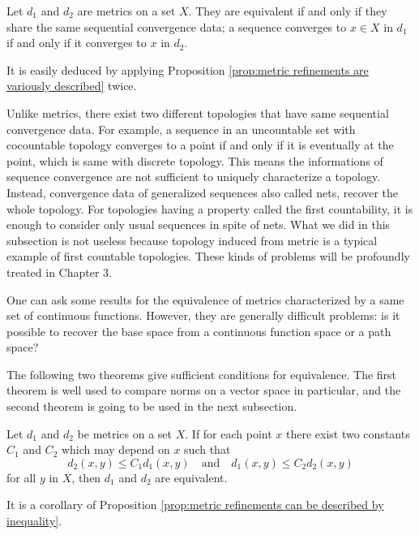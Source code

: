 \begin{prop}\label{prop:sequential convergence determines equivalent metrics}
Let $d_1$ and $d_2$ are metrics on a set $X$.
They are equivalent if and only if they share the same sequential convergence data; a sequence converges to $x\in X$ in $d_1$ if and only if it converges to $x$ in $d_2$.
\end{prop}
\begin{pf}
It is easily deduced by applying Proposition \ref{prop:metric refinements are variously described} twice.
\end{pf}

\begin{rmk}
Unlike metrics, there exist two different topologies that have same sequential convergence data.
For example, a sequence in an uncountable set with cocountable topology converges to a point if and only if it is eventually at the point, which is same with discrete topology.
This means the informations of sequence convergence are not sufficient to uniquely characterize a topology.
Instead, convergence data of generalized sequences also called nets, recover the whole topology.
For topologies having a property called the first countability, it is enough to consider only usual sequences in spite of nets.
What we did in this subsection is not useless because topology induced from metric is a typical example of first countable topologies.
These kinds of problems will be profoundly treated in Chapter 3.
\end{rmk}
\begin{rmk}
One can ask some results for the equivalence of metrics characterized by a same set of continuous functions.
However, they are generally difficult problems: is it possible to recover the base space from a continuous function space or a path space?
\end{rmk}

The following two theorems give sufficient conditions for equivalence.
The first theorem is well used to compare norms on a vector space in particular, and the second theorem is going to be used in the next subsection.

\begin{thm}\label{thm:metric equivalence can be described by inequalities}
Let $d_1$ and $d_2$ be metrics on a set $X$.
If for each point $x$ there exist two constants $C_1$ and $C_2$ which may depend on $x$ such that
\[d_2(x,y)\le C_1d_1(x,y)\quad\text{and}\quad d_1(x,y)\le C_2d_2(x,y)\]
for all $y$ in $X$, then $d_1$ and $d_2$ are equivalent.
\end{thm}
\begin{pf}
It is a corollary of Proposition \ref{prop:metric refinements can be described by inequality}.
\end{pf}

